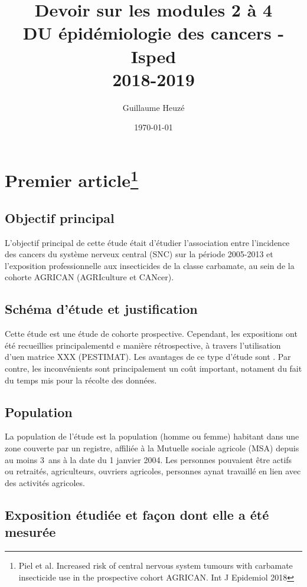 \documentclass[10pt]{article}
\begin{document}
\title{Devoir sur les modules 2 à 4\\
\small{DU épidémiologie des cancers - Isped\\
2018-2019}}
\author{Guillaume Heuzé}
\date{\today}
\maketitle

\section{Premier article\protect\footnote{Piel et al. Increased risk of central nervous system tumours with carbamate insecticide use in the prospective cohort AGRICAN. Int J Epidemiol 2018}}
\subsection{Objectif principal}
L'objectif principal de cette étude était d'étudier l'association entre l'incidence des cancers du système nerveux central (SNC) sur la période 2005-2013 et l'exposition professionnelle aux insecticides de la classe carbamate, au sein de la cohorte AGRICAN (AGRIculture et CANcer).

\subsection{Schéma d'étude et justification}
Cette étude est une étude de cohorte prospective. Cependant, les expositions ont été recueillies principalementd e manière rétrospective, à travers  l'utilisation d'uen matrice  XXX (PESTIMAT). Les avantages de ce type d'étude sont . Par contre, les inconvénients sont principalement un coût important, notament du fait du temps mis pour la récolte des données.

\subsection{Population}
La population de l'étude est la population (homme ou femme) habitant dans une zone couverte par un registre, affiliée à la Mutuelle sociale agricole (MSA) depuis au moins 3~ans à la date du 1  janvier 2004. Les personnes pouvaient être actifs ou retraités, agriculteurs, ouvriers agricoles, personnes aynat travaillé en lien avec des activités agricoles.

\subsection{Exposition étudiée et façon dont elle a été mesurée}
\end{document}
